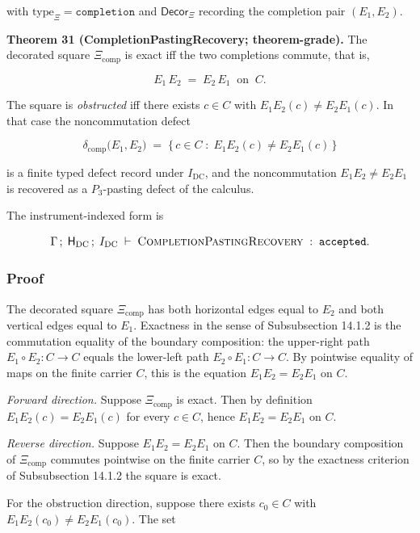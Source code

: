 \documentclass[11pt]{article}
\theoremstyle{definition}
\begin{document}
with \(\mathrm{type}_{\Xi}=\texttt{completion}\) and \(\mathsf{Decor}_{\Xi}\) recording the completion pair \((E_{1},E_{2})\).

\textbf{Theorem 31 (CompletionPastingRecovery; theorem-grade).} The decorated square \(\Xi_{\mathrm{comp}}\) is exact iff the two completions commute, that is,

\[
E_{1}\,E_{2}\;=\;E_{2}\,E_{1}\;\;\text{on}\;\;C.
\]

The square is \emph{obstructed} iff there exists \(c\in C\) with \(E_{1}E_{2}(c)\neq E_{2}E_{1}(c)\). In that case the noncommutation defect

\[
\delta_{\mathrm{comp}}\bigl(E_{1},E_{2}\bigr)\;=\;\bigl\{\,c\in C\;:\;E_{1}E_{2}(c)\neq E_{2}E_{1}(c)\,\bigr\}
\]

is a finite typed defect record under \(I_{\mathrm{DC}}\), and the noncommutation \(E_{1}E_{2}\neq E_{2}E_{1}\) is recovered as a \(P_{3}\)-pasting defect of the calculus.

The instrument-indexed form is

\[
\Gamma\,;\;\mathsf H_{\mathrm{DC}}\,;\;I_{\mathrm{DC}}\;\vdash\;\textsc{CompletionPastingRecovery}\;:\;\texttt{accepted}.
\]

\subsubsection{Proof}

The decorated square \(\Xi_{\mathrm{comp}}\) has both horizontal edges equal to \(E_{2}\) and both vertical edges equal to \(E_{1}\). Exactness in the sense of Subsubsection 14.1.2 is the commutation equality of the boundary composition: the upper-right path \(E_{1}\circ E_{2}:C\to C\) equals the lower-left path \(E_{2}\circ E_{1}:C\to C\). By pointwise equality of maps on the finite carrier \(C\), this is the equation \(E_{1}E_{2}=E_{2}E_{1}\) on \(C\).

\emph{Forward direction.} Suppose \(\Xi_{\mathrm{comp}}\) is exact. Then by definition \(E_{1}E_{2}(c)=E_{2}E_{1}(c)\) for every \(c\in C\), hence \(E_{1}E_{2}=E_{2}E_{1}\) on \(C\).

\emph{Reverse direction.} Suppose \(E_{1}E_{2}=E_{2}E_{1}\) on \(C\). Then the boundary composition of \(\Xi_{\mathrm{comp}}\) commutes pointwise on the finite carrier \(C\), so by the exactness criterion of Subsubsection 14.1.2 the square is exact.

For the obstruction direction, suppose there exists \(c_{0}\in C\) with \(E_{1}E_{2}(c_{0})\neq E_{2}E_{1}(c_{0})\). The set
\end{document}

